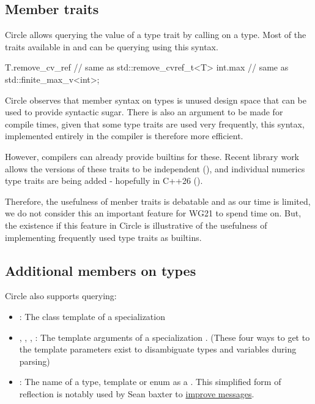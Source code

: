 \documentclass{wg21}
\begin{document}
\subsection{Member traits}
\label{sec:membertraits}

Circle allows querying the value of a type trait by calling \emph{} on a type.
Most of the traits available in  and  can be querying using this syntax.

\begin{colorblock}
T.remove_cv_ref  // same as std::remove_cvref_t<T>
int.max          // same as std::finite_max_v<int>;
\end{colorblock}

Circle observes that member syntax on types is unused design space that can be used to provide syntactic sugar.
There is also an argument to be made for compile times, given that some type traits are used very frequently,
this syntax, implemented entirely in the compiler is therefore more efficient.

However, compilers can already provide builtins for these.
Recent library work allows the  versions of these traits to be independent (),
and individual numerics type traits are being added - hopefully in C++26 ().

Therefore, the usefulness of menber traits is debatable and as our time is limited, we do not consider this an important feature
for WG21 to spend time on.
But, the existence if this feature in Circle is illustrative of the usefulness of implementing frequently used type traits as builtins.

\subsection{Additional members on types}

Circle also supports querying:

\begin{itemize}
\item {} : The class template of a specialization 
\item {}, , ,  : The template arguments of a specialization .
      (These four ways to get to the template parameters exist to disambiguate types and variables during parsing)
\item {}: The name of a type, template or enum as a . This simplified form of reflection is notably used by Sean baxter to \hyperref[sec:static_assert_expr]{improve  messages}.
\end{itemize}
\end{document}
